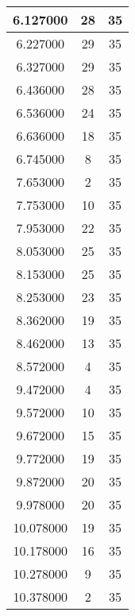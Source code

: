 \begin{longtable}[htbp]{|c|c|c|}
6.127000 & 28 & 35 \\ \hline
6.227000 & 29 & 35 \\ \hline
6.327000 & 29 & 35 \\ \hline
6.436000 & 28 & 35 \\ \hline
6.536000 & 24 & 35 \\ \hline
6.636000 & 18 & 35 \\ \hline
6.745000 & 8 & 35 \\ \hline
7.653000 & 2 & 35 \\ \hline
7.753000 & 10 & 35 \\ \hline
7.953000 & 22 & 35 \\ \hline
8.053000 & 25 & 35 \\ \hline
8.153000 & 25 & 35 \\ \hline
8.253000 & 23 & 35 \\ \hline
8.362000 & 19 & 35 \\ \hline
8.462000 & 13 & 35 \\ \hline
8.572000 & 4 & 35 \\ \hline
9.472000 & 4 & 35 \\ \hline
9.572000 & 10 & 35 \\ \hline
9.672000 & 15 & 35 \\ \hline
9.772000 & 19 & 35 \\ \hline
9.872000 & 20 & 35 \\ \hline
9.978000 & 20 & 35 \\ \hline
10.078000 & 19 & 35 \\ \hline
10.178000 & 16 & 35 \\ \hline
10.278000 & 9 & 35 \\ \hline
10.378000 & 2 & 35 \\ \hline
\end{longtable}
